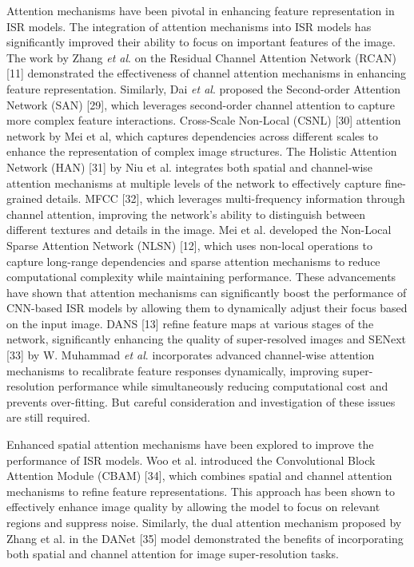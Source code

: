 \documentclass{ieeeaccess}
\begin{document}
Attention mechanisms have been pivotal in enhancing feature representation in ISR models. The integration of attention mechanisms into ISR models has significantly improved their ability to focus on important features of the image. The work by Zhang \textit{et al}. on the Residual Channel Attention Network (RCAN) [11] demonstrated the effectiveness of channel attention mechanisms in enhancing feature representation. Similarly, Dai \textit{et al}. proposed the Second-order Attention Network (SAN) [29], which leverages second-order channel attention to capture more complex feature interactions. Cross-Scale Non-Local (CSNL) [30] attention network by Mei et al, which captures dependencies across different scales to enhance the representation of complex image structures. The Holistic Attention Network (HAN) [31] by Niu et al. integrates both spatial and channel-wise attention mechanisms at multiple levels of the network to effectively capture fine-grained details. MFCC [32], which leverages multi-frequency information through channel attention, improving the network's ability to distinguish between different textures and details in the image. Mei et al. developed the Non-Local Sparse Attention Network (NLSN) [12], which uses non-local operations to capture long-range dependencies and sparse attention mechanisms to reduce computational complexity while maintaining performance. These advancements have shown that attention mechanisms can significantly boost the performance of CNN-based ISR models by allowing them to dynamically adjust their focus based on the input image. DANS [13] refine feature maps at various stages of the network, significantly enhancing the quality of super-resolved images and SENext [33] by W. Muhammad \textit{et al}. incorporates advanced channel-wise attention mechanisms to recalibrate feature responses dynamically, improving super-resolution performance while simultaneously reducing computational cost and prevents over-fitting. But careful consideration and investigation of these issues are still required.

Enhanced spatial attention mechanisms have been explored to improve the performance of ISR models. Woo et al. introduced the Convolutional Block Attention Module (CBAM) [34], which combines spatial and channel attention mechanisms to refine feature representations. This approach has been shown to effectively enhance image quality by allowing the model to focus on relevant regions and suppress noise. Similarly, the dual attention mechanism proposed by Zhang et al. in the DANet [35] model demonstrated the benefits of incorporating both spatial and channel attention for image super-resolution tasks.
\end{document}
